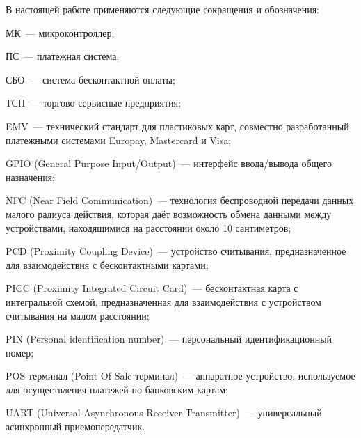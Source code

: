 \newpage


В настоящей работе применяются следующие сокращения и обозначения:

\begin{description}

	\item МК~--- микроконтроллер;
	\item ПС~--- платежная система;
	\item СБО~--- система бесконтактной оплаты;
	\item ТСП~--- торгово-сервисные предприятия;

	\item EMV~--- технический стандарт для пластиковых карт, совместно разработанный платежными системами Europay, Mastercard и Visa;
	\item GPIO (General Purpose Input/Output)~--- интерфейс ввода/вывода общего назначения;
	\item NFC (Near Field Communication)~--- технология беспроводной передачи данных малого радиуса действия, которая даёт возможность обмена данными между устройствами, находящимися на расстоянии около 10 сантиметров;
	\item PCD (Proximity Coupling Device)~--- устройство считывания, предназначенное для взаимодействия с бесконтактными картами;
	\item PICC (Proximity Integrated Circuit Card)~--- бесконтактная карта с интегральной схемой, предназначенная для взаимодействия с устройством считывания на малом расстоянии;
	\item PIN (Personal identification number)~--- персональный идентификационный номер;
	\item POS-терминал (Point Of Sale терминал)~--- аппаратное устройство, используемое для осуществления платежей по банковским картам;
	\item UART (Universal Asynchronous Receiver-Transmitter)~--- универсальный асинхронный приемопередатчик.

\item \end{description}

